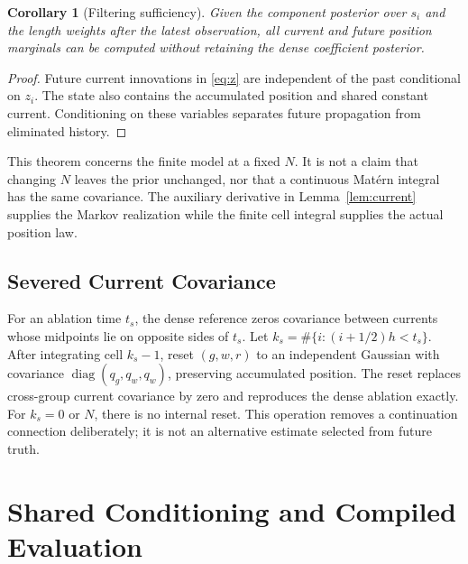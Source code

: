 \documentclass[journal]{IEEEtran}
\newtheorem{corollary}{Corollary}
\newcommand{\diag}{\operatorname{diag}}
\begin{document}
\begin{corollary}[Filtering sufficiency]
Given the component posterior over $s_i$ and the length weights after the
latest observation, all current and future position marginals can be
computed without retaining the dense coefficient posterior.
\end{corollary}
\begin{proof}
Future current innovations in \eqref{eq:z} are independent of the past
conditional on $z_i$. The state also contains the accumulated position
and shared constant current. Conditioning on these variables separates
future propagation from eliminated history.
\end{proof}

This theorem concerns the finite model at a fixed $N$. It is not a claim
that changing $N$ leaves the prior unchanged, nor that a continuous
Mat\'ern integral has the same covariance. The auxiliary derivative in
Lemma~\ref{lem:current} supplies the Markov realization while the finite
cell integral supplies the actual position law.

\subsection{Severed Current Covariance}

For an ablation time $t_s$, the dense reference zeros covariance between
currents whose midpoints lie on opposite sides of $t_s$. Let
$k_s=\#\{i:(i+1/2)h<t_s\}$. After integrating cell $k_s-1$, reset
$(g,w,r)$ to an independent Gaussian with covariance
$\diag(q_g,q_w,q_w)$, preserving accumulated position. The reset replaces
cross-group current covariance by zero and reproduces the dense ablation
exactly. For $k_s=0$ or $N$, there is no internal reset. This operation
removes a continuation connection deliberately; it is not an alternative
estimate selected from future truth.

\section{Shared Conditioning and Compiled Evaluation}
\label{sec:implementation}
\end{document}
